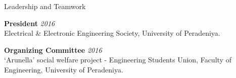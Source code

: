 \documentclass[
11pt, %
]{./assets/resume} %
\begin{document}

\begin{rSection}{Leadership and Teamwork}

\textbf{President} \hfill \textit{2016} \\
Electrical \& Electronic Engineering Society, University of Peradeniya.

\textbf{Organizing Committee} \hfill \textit{2016} \\
‘Arunella' social welfare project - Engineering Students Union, Faculty of Engineering, University of Peradeniya.

\end{rSection}
\end{document}
